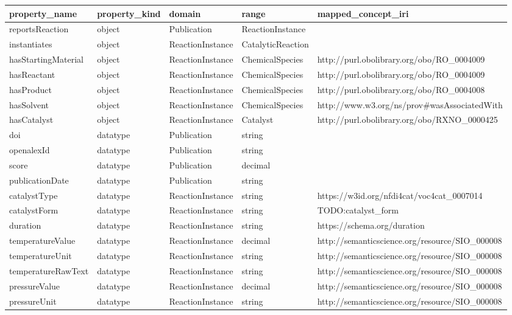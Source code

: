 \begin{tabular}{lllll}
\toprule
property\_name & property\_kind & domain & range & mapped\_concept\_iri \\
\midrule
reportsReaction & object & Publication & ReactionInstance &  \\
instantiates & object & ReactionInstance & CatalyticReaction &  \\
hasStartingMaterial & object & ReactionInstance & ChemicalSpecies & http://purl.obolibrary.org/obo/RO\_0004009 \\
hasReactant & object & ReactionInstance & ChemicalSpecies & http://purl.obolibrary.org/obo/RO\_0004009 \\
hasProduct & object & ReactionInstance & ChemicalSpecies & http://purl.obolibrary.org/obo/RO\_0004008 \\
hasSolvent & object & ReactionInstance & ChemicalSpecies & http://www.w3.org/ns/prov\#wasAssociatedWith \\
hasCatalyst & object & ReactionInstance & Catalyst & http://purl.obolibrary.org/obo/RXNO\_0000425 \\
doi & datatype & Publication & string &  \\
openalexId & datatype & Publication & string &  \\
score & datatype & Publication & decimal &  \\
publicationDate & datatype & Publication & string &  \\
catalystType & datatype & ReactionInstance & string & https://w3id.org/nfdi4cat/voc4cat\_0007014 \\
catalystForm & datatype & ReactionInstance & string & TODO:catalyst\_form \\
duration & datatype & ReactionInstance & string & https://schema.org/duration \\
temperatureValue & datatype & ReactionInstance & decimal & http://semanticscience.org/resource/SIO\_000008 \\
temperatureUnit & datatype & ReactionInstance & string & http://semanticscience.org/resource/SIO\_000008 \\
temperatureRawText & datatype & ReactionInstance & string & http://semanticscience.org/resource/SIO\_000008 \\
pressureValue & datatype & ReactionInstance & decimal & http://semanticscience.org/resource/SIO\_000008 \\
pressureUnit & datatype & ReactionInstance & string & http://semanticscience.org/resource/SIO\_000008 \\

\end{tabular}
